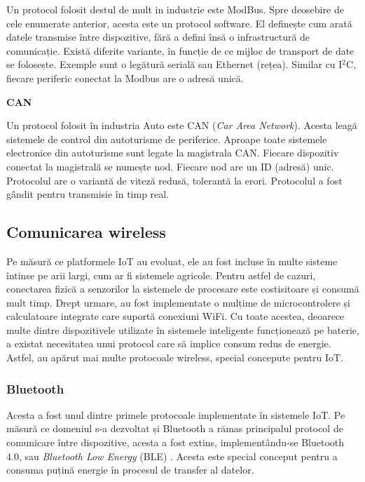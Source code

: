Un protocol folosit destul de mult in industrie este ModBus. Spre deosebire de
cele enumerate anterior, acesta este un protocol software. El definește cum
arată datele transmise între dispozitive, fără a defini însă o infrastructură
de comunicație. Există diferite variante, în funcție de ce mijloc de transport
de date se folosește. Exemple sunt o legătură serială sau Ethernet (rețea).
Similar cu I$^2$C, fiecare periferic conectat la Modbus are o adresă unică.

\textbf{CAN}

Un protocol folosit în industria Auto este CAN (\textit{Car Area Network}). Acesta leagă sistemele de control
din autoturisme de periferice. Aproape toate sistemele electronice din
autoturisme sunt legate la magistrala CAN. Fiecare
dispozitiv conectat la magistrală se numește nod. Fiecare nod are un ID (adresă)
unic. Protocolul are o variantă de viteză redusă, tolerantă la
erori. Protocolul a fost gândit pentru transmisie în timp real.

\subsection{Comunicarea wireless}
\label{sec:embed:bus:wireless}

Pe măsură ce platformele IoT au evoluat, ele au fost incluse în multe sisteme
întinse pe arii largi, cum ar fi sistemele agricole. Pentru astfel de cazuri,
conectarea fizică a senzorilor la sistemele de procesare este costisitoare și
consumă mult timp. Drept urmare, au fost implementate o mulțime de
microcontrolere și calculatoare integrate care suportă conexiuni WiFi. Cu toate
acestea, deoarece multe dintre dispozitivele utilizate în sistemele inteligente
funcționează pe baterie, a existat necesitatea unui protocol care să implice
consum redus de energie. Astfel, au apărut mai multe protocoale wireless,
special concepute pentru IoT.

\subsubsection{Bluetooth}
\label{sec:embed:bus:wireless:bluetooth}

Acesta a fost unul dintre primele protocoale implementate în sistemele IoT. Pe
măsură ce domeniul s-a dezvoltat și Bluetooth a rămas principalul protocol de
comunicare între dispozitive, acesta a fost extins, implementându-se Bluetooth
4.0, sau \textit{Bluetooth Low Energy} (BLE) . Acesta
este special conceput pentru a consuma puțină energie în procesul de transfer al
datelor.

